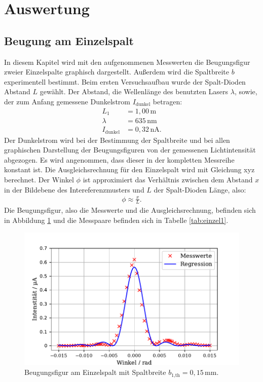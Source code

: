 \section{Auswertung}
\label{sec:Auswertung}
\subsection{Beugung am Einzelspalt}
In diesem Kapitel wird mit den aufgenommenen Messwerten die Beugungsfigur zweier Einzelspalte graphisch dargestellt.
Außerdem wird die Spaltbreite $b$ experimentell bestimmt.
Beim ersten Versuchsaufbau wurde der Spalt-Dioden Abstand $L$ gewählt. Der Abstand, die Wellenlänge
des benutzten Lasers $\lambda$, sowie, der zum Anfang gemessene Dunkelstrom $I_\text{dunkel}$ betragen:
\begin{align*}
  L_1 &= 1,00\,\si{\meter} \\
  \lambda &= 635\,\si{\nano\meter} \\
  I_\text{dunkel} &= 0,32\,\si{\nano\ampere}.
\end{align*}
Der Dunkelstrom wird bei der Bestimmung der Spaltbreite und bei allen graphischen
Darstellung der Beugungsfiguren von der gemessenen Lichtintensität abgezogen. Es wird angenommen, dass dieser in der kompletten
Messreihe konstant ist.
Die Ausgleichsrechnung für den Einzelspalt wird mit Gleichung xyz berechnet. Der Winkel $\phi$ ist approximiert
das Verhältnis zwischen dem Abstand $x$ in der Bildebene des Intereferenzmusters und $L$ der Spalt-Dioden Länge, also:
\begin{align*}
\phi \approx \frac{x}{L}.
\end{align*}
Die Beugungsfigur, also die Messwerte und die Ausgleichsrechnung, befinden sich in Abbildung \ref{fig:einzel1}
und die Messpaare befinden sich in Tabelle \ref{tab:einzel1}.


\begin{figure}[H]
  \center
  \includegraphics[scale = 0.75]{einzel1.pdf}
  \caption{Beugungsfigur am Einzelspalt mit Spaltbreite $b_\text{1,th} = 0,15\,\si{\milli\meter}$.}
  \label{fig:einzel1}
\end{figure}

